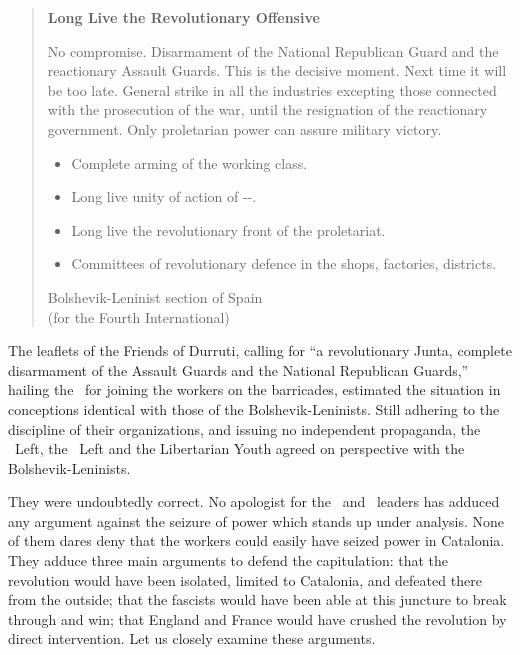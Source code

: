 \begin{oframed}
\begin{quotation}
  \noindent
  {\bfseries\sffamily\normalsize\centering Long Live the Revolutionary Offensive \par}
  
  \bigskip
  
  \noindent
  No compromise. Disarmament of the National Republican Guard and the reactionary Assault Guards. This is the decisive moment. Next time it will be too late. General strike in all the industries excepting those connected with the prosecution of the war, until the resignation of the reactionary government. Only proletarian power can assure military victory.

  \begin{itemize}
  	\item Complete arming of the working class.
  	\item Long live unity of action of \CNT-\FAI-\POUM.
  	\item Long live the revolutionary front of the proletariat.
  	\item Committees of revolutionary defence in the shops, factories, districts.
  \end{itemize}
	
  \begin{flushright}
    Bolshevik-Leninist section of Spain \\
    (for the Fourth International)
  \end{flushright}
\end{quotation}
\end{oframed}

\medskip

The leaflets of the Friends of Durruti, calling for ``a revolutionary Junta, complete disarmament of the Assault Guards and the National Republican Guards,'' hailing the \POUM\ for joining the workers on the barricades, estimated the situation in conceptions identical with those of the Bolshevik-Leninists. Still adhering to the discipline of their organizations, and issuing no independent propaganda, the \POUM\ Left, the \CNT\ Left and the Libertarian Youth agreed on perspective with the Bolshevik-Leninists.

They were undoubtedly correct. No apologist for the \CNT\ and \POUM\ leaders has adduced any argument against the seizure of power which stands up under analysis. None of them dares deny that the workers could easily have seized power in Catalonia. They adduce three main arguments to defend the capitulation: that the revolution would have been isolated, limited to Catalonia, and defeated there from the outside; that the fascists would have been able at this juncture to break through and win; that England and France would have crushed the revolution by direct intervention. Let us closely examine these arguments.

